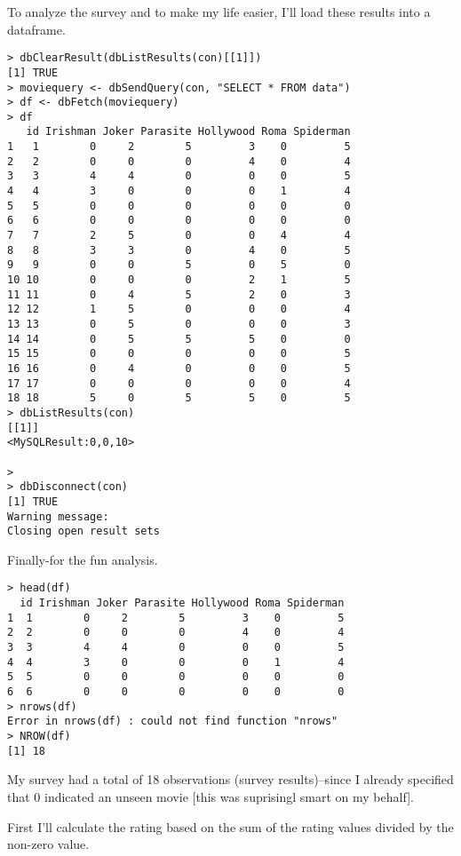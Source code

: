 \documentclass[
]{article}
\begin{document}
To analyze the survey and to make my life easier, I'll load these
results into a dataframe.

\begin{verbatim}
> dbClearResult(dbListResults(con)[[1]])
[1] TRUE
> moviequery <- dbSendQuery(con, "SELECT * FROM data")
> df <- dbFetch(moviequery)
> df
   id Irishman Joker Parasite Hollywood Roma Spiderman
1   1        0     2        5         3    0         5
2   2        0     0        0         4    0         4
3   3        4     4        0         0    0         5
4   4        3     0        0         0    1         4
5   5        0     0        0         0    0         0
6   6        0     0        0         0    0         0
7   7        2     5        0         0    4         4
8   8        3     3        0         4    0         5
9   9        0     0        5         0    5         0
10 10        0     0        0         2    1         5
11 11        0     4        5         2    0         3
12 12        1     5        0         0    0         4
13 13        0     5        0         0    0         3
14 14        0     5        5         5    0         0
15 15        0     0        0         0    0         5
16 16        0     4        0         0    0         5
17 17        0     0        0         0    0         4
18 18        5     0        5         5    0         5
> dbListResults(con)
[[1]]
<MySQLResult:0,0,10>

> 
> dbDisconnect(con)
[1] TRUE
Warning message:
Closing open result sets
\end{verbatim}

Finally-for the fun analysis.

\begin{verbatim}
> head(df)
  id Irishman Joker Parasite Hollywood Roma Spiderman
1  1        0     2        5         3    0         5
2  2        0     0        0         4    0         4
3  3        4     4        0         0    0         5
4  4        3     0        0         0    1         4
5  5        0     0        0         0    0         0
6  6        0     0        0         0    0         0
> nrows(df)
Error in nrows(df) : could not find function "nrows"
> NROW(df)
[1] 18
\end{verbatim}

My survey had a total of 18 observations (survey results)--since I
already specified that 0 indicated an unseen movie {[}this was
suprisingl smart on my behalf{]}.

First I'll calculate the rating based on the sum of the rating values
divided by the non-zero value.
\end{document}
